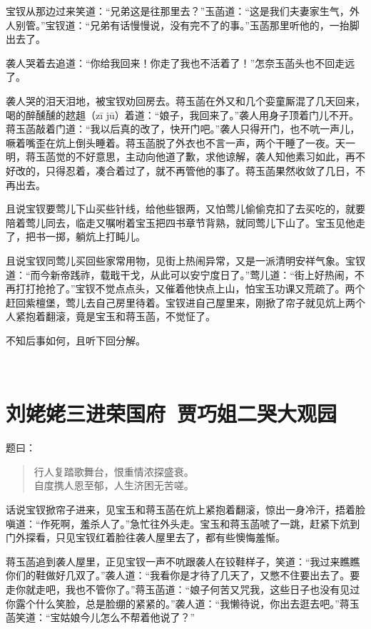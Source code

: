 \documentclass[12pt,oneside]{book}
\newenvironment{shici}{%
\begin{verse}%
\centering\large\hspace{12pt}}%
{\end{verse}}
\begin{document}
宝钗从那边过来笑道：“兄弟这是往那里去？”玉菡道：“这是我们夫妻家生气，外人别管。”宝钗道：“兄弟有话慢慢说，没有完不了的事。”玉菡那里听他的，一抬脚出去了。

袭人哭着去追道：“你给我回来！你走了我也不活着了！”怎奈玉菡头也不回走远了。

袭人哭的泪天泪地，被宝钗劝回房去。蒋玉菡在外又和几个娈童厮混了几天回来，喝的醉醺醺的趑趄（zī jū）着道：“娘子，我回来了。”袭人用身子顶着门儿不开。蒋玉菡敲着门道：“我以后真的改了，快开门吧。”袭人只得开门，也不吭一声儿，噘着嘴歪在炕上倒头睡着。蒋玉菡脱了外衣也不言一声，两个干睡了一夜。天一明，蒋玉菡觉的不好意思，主动向他道了歉，求他谅解，袭人知他素习如此，再不好改的，只得忍着，凑合着过了，就不再管他的事了。蒋玉菡果然收敛了几日，不再出去。

且说宝钗要莺儿下山买些针线，给他些银两，又怕莺儿偷偷克扣了去买吃的，就要陪着莺儿同去，临走又嘱咐着宝玉把四书章节背熟，就同莺儿下山了。宝玉见他走了，把书一掷，躺炕上打盹儿。

且说宝钗同莺儿买回些家常用物，见街上热闹异常，又是一派清明安祥气象。宝钗道：“而今新帝践祚，载戢干戈，从此可以安宁度日了。”莺儿道：“街上好热闹，不再打打抢抢了。”宝钗不觉点点头，又催着他快点上山，怕宝玉功课又荒疏了。两个赶回紫檀堡，莺儿去自己房里待着。宝钗进自己屋里来，刚掀了帘子就见炕上两个人紧抱着翻滚，竟是宝玉和蒋玉菡，不觉怔了。

不知后事如何，且听下回分解。

 
 
\chapter{刘姥姥三进荣国府~贾巧姐二哭大观园}
题曰：

\begin{shici}
行人复踏歌舞台，恨重情浓探盛衰。\\
自度携人恩至郁，人生济困无苦嗟。
\end{shici}


话说宝钗掀帘子进来，见宝玉和蒋玉菡在炕上紧抱着翻滚，惊出一身冷汗，捂着脸嗔道：“作死啊，羞杀人了。”急忙往外头走。宝玉和蒋玉菡唬了一跳，赶紧下炕到门外探看，只见宝钗红着脸往袭人屋里去了，都有些懊悔羞惭。

蒋玉菡追到袭人屋里，正见宝钗一声不吭跟袭人在铰鞋样子，笑道：“我过来瞧瞧你们的鞋做好几双了。”袭人道：“我看你是才待了几天了，又憋不住要出去了。要走你就走吧，我也不管你了。”蒋玉菡道：“娘子何苦又咒我，这些日子也没有见过你露个什么笑脸，总是脸绷的紧紧的。”袭人道：“我懒待说，你出去逛去吧。”蒋玉菡笑道：“宝姑娘今儿怎么不帮着他说了？”
\end{document}
